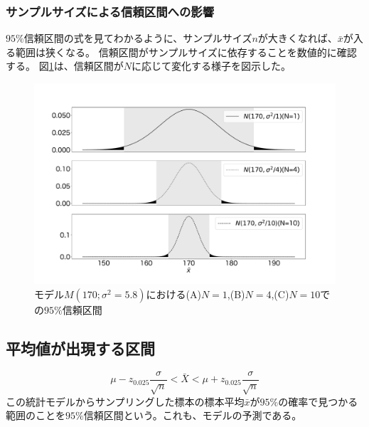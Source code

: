\subsubsection{サンプルサイズによる信頼区間への影響}
$95\%$信頼区間の式を見てわかるように、サンプルサイズ$n$が大きくなれば、$\bar{x}$が入る範囲は狭くなる。
信頼区間がサンプルサイズに依存することを数値的に確認する。
図\ref{fig:confidence_interval_n}は、信頼区間が$N$に応じて変化する様子を図示した。

\begin{figure}
\begin{center}
    \includegraphics[width=15cm]{./image/03_/confidence_interval.pdf}
    \caption{モデル$M(170;\sigma^2=5.8)$における(A)$N=1$,(B)$N=4$,(C)$N=10$での$95\%$信頼区間}
    \label{fig:confidence_interval_n}
    \end{center}
\end{figure}



\subsection{平均値が出現する区間}
\begin{equation*}
    \mu - z_{0.025} \frac{\sigma}{\sqrt{n}} < \bar{X} < \mu + z_{0.025} \frac{\sigma}{\sqrt{n}}
\end{equation*}
この統計モデルからサンプリングした標本の標本平均$\bar{x}$が$95\%$の確率で見つかる範囲のことを$95\%$信頼区間という。これも、モデルの予測である。

